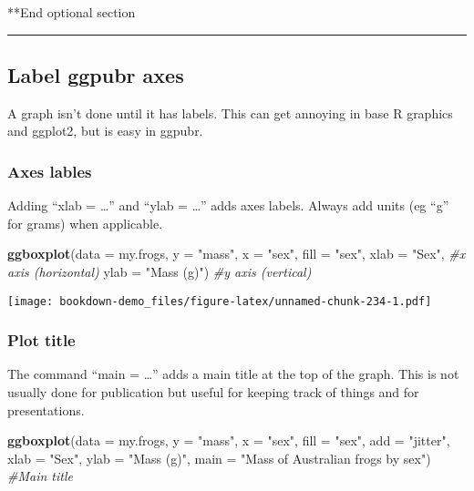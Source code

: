 \documentclass[]{book}
\newenvironment{Shaded}{\begin{snugshade}}{\end{snugshade}}
\newcommand{\KeywordTok}[1]{\textcolor[rgb]{0.13,0.29,0.53}{\textbf{#1}}}
\newcommand{\DataTypeTok}[1]{\textcolor[rgb]{0.13,0.29,0.53}{#1}}
\newcommand{\StringTok}[1]{\textcolor[rgb]{0.31,0.60,0.02}{#1}}
\newcommand{\CommentTok}[1]{\textcolor[rgb]{0.56,0.35,0.01}{\textit{#1}}}
\newcommand{\NormalTok}[1]{#1}
\theoremstyle{definition}
\theoremstyle{definition}
\theoremstyle{definition}
\theoremstyle{remark}
\begin{document}
**End optional section

\begin{center}\rule{0.5\linewidth}{\linethickness}\end{center}

\subsection{Label ggpubr axes}\label{label-ggpubr-axes}

A graph isn't done until it has labels. This can get annoying in base R
graphics and ggplot2, but is easy in ggpubr.

\subsubsection{Axes lables}\label{axes-lables}

Adding ``xlab = \ldots{}'' and ``ylab = \ldots{}'' adds axes labels.
Always add units (eg ``g'' for grams) when applicable.

\begin{Shaded}
\begin{Highlighting}[]
\KeywordTok{ggboxplot}\NormalTok{(}\DataTypeTok{data =}\NormalTok{ my.frogs,}
          \DataTypeTok{y =} \StringTok{"mass"}\NormalTok{,}
          \DataTypeTok{x =} \StringTok{"sex"}\NormalTok{,}
          \DataTypeTok{fill =} \StringTok{"sex"}\NormalTok{,}
          \DataTypeTok{xlab =} \StringTok{"Sex"}\NormalTok{,      }\CommentTok{#x axis (horizontal)}
          \DataTypeTok{ylab =} \StringTok{"Mass (g)"}\NormalTok{) }\CommentTok{#y axis (vertical)}
\end{Highlighting}
\end{Shaded}

\texttt{[image: bookdown-demo\_files/figure-latex/unnamed-chunk-234-1.pdf]}

\subsubsection{Plot title}\label{plot-title}

The command ``main = \ldots{}'' adds a main title at the top of the
graph. This is not usually done for publication but useful for keeping
track of things and for presentations.

\begin{Shaded}
\begin{Highlighting}[]
\KeywordTok{ggboxplot}\NormalTok{(}\DataTypeTok{data =}\NormalTok{ my.frogs,}
          \DataTypeTok{y =} \StringTok{"mass"}\NormalTok{,}
          \DataTypeTok{x =} \StringTok{"sex"}\NormalTok{,}
          \DataTypeTok{fill =} \StringTok{"sex"}\NormalTok{,}
          \DataTypeTok{add =} \StringTok{"jitter"}\NormalTok{,}
          \DataTypeTok{xlab =} \StringTok{"Sex"}\NormalTok{,}
          \DataTypeTok{ylab =} \StringTok{"Mass (g)"}\NormalTok{,}
          \DataTypeTok{main =} \StringTok{"Mass of Australian frogs by sex"}\NormalTok{) }\CommentTok{#Main title}
\end{Highlighting}
\end{Shaded}
\end{document}
